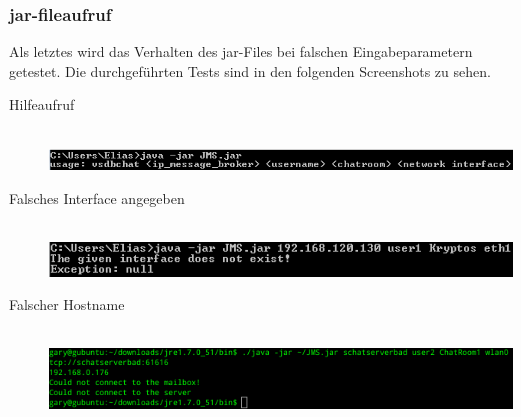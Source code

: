 \documentclass[11pt, a4paper]{article}
\begin{document}
\subsubsection{jar-fileaufruf}
Als letztes wird das Verhalten des jar-Files bei falschen Eingabeparametern getestet.
Die durchgeführten Tests sind in den folgenden Screenshots zu sehen.

\begin{center}
  \begin{description}
  \item[Hilfeaufruf] \hfill \\
    \includegraphics[width=6in]{pic/help.png}
  \item[Falsches Interface angegeben] \hfill \\
    \includegraphics[width=6in]{pic/wrongiface.png}
  \item[Falscher Hostname] \hfill \\
    \includegraphics[width=6in]{pic/badhost.png}
  \end{description}
\end{center}

\newpage

{}

\end{document}
